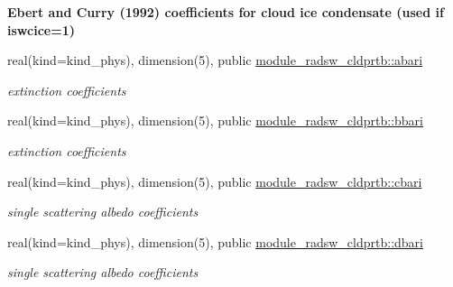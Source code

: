 \begin{Indent}\textbf{ Ebert and Curry (1992) coefficients for cloud ice condensate (used if iswcice=1)}\par
\begin{DoxyCompactItemize}
\item 
\mbox{\label{namespacemodule__radsw__cldprtb_ace960bbbf15ab3cadbee76301ff111dd}} 
real(kind=kind\+\_\+phys), dimension(5), public \hyperlink{namespacemodule__radsw__cldprtb_ace960bbbf15ab3cadbee76301ff111dd}{module\+\_\+radsw\+\_\+cldprtb\+::abari}
\begin{DoxyCompactList}\small\item\em extinction coefficients \end{DoxyCompactList}\item 
\mbox{\label{namespacemodule__radsw__cldprtb_ad5342321ccd4759cb70f7a673620ee19}} 
real(kind=kind\+\_\+phys), dimension(5), public \hyperlink{namespacemodule__radsw__cldprtb_ad5342321ccd4759cb70f7a673620ee19}{module\+\_\+radsw\+\_\+cldprtb\+::bbari}
\begin{DoxyCompactList}\small\item\em extinction coefficients \end{DoxyCompactList}\item 
\mbox{\label{namespacemodule__radsw__cldprtb_ae7f1de5c9736894ac7b54c0e0d312f16}} 
real(kind=kind\+\_\+phys), dimension(5), public \hyperlink{namespacemodule__radsw__cldprtb_ae7f1de5c9736894ac7b54c0e0d312f16}{module\+\_\+radsw\+\_\+cldprtb\+::cbari}
\begin{DoxyCompactList}\small\item\em single scattering albedo coefficients \end{DoxyCompactList}\item 
\mbox{\label{namespacemodule__radsw__cldprtb_af8b02590603ea2f838d954cb0a93bbeb}} 
real(kind=kind\+\_\+phys), dimension(5), public \hyperlink{namespacemodule__radsw__cldprtb_af8b02590603ea2f838d954cb0a93bbeb}{module\+\_\+radsw\+\_\+cldprtb\+::dbari}
\begin{DoxyCompactList}\small\item\em single scattering albedo coefficients \end{DoxyCompactList}\item 

\end{DoxyCompactItemize}
\end{Indent}

